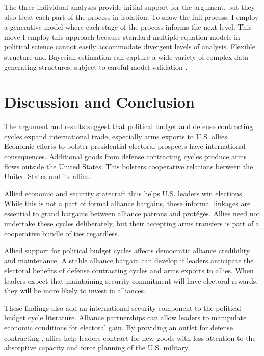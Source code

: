 \documentclass[12pt]{article}
\begin{document}
The three individual analyses provide initial support for the argument, but they also treat each part of the process in isolation. 
To show the full process, I employ a generative model where each stage of the process informs the next level.
This move 
I employ this approach because standard multiple-equation models in political science cannot easily accommodate divergent levels of analysis.
Flexible structure and Bayesian estimation can capture a wide variety of complex data-generating structures, subject to careful model validation \citep{Betancourt2021}. 





\section{Discussion and Conclusion}


The argument and results suggest that political budget and defense contracting cycles expand international trade, especially arms exports to U.S. allies. 
Economic efforts to bolster presidential electoral prospects have international consequences. 
Additional goods from defense contracting cycles produce arms flows outside the United States.
This bolsters cooperative relations between the United States and its allies.


Allied economic and security statecraft thus helps U.S. leaders win elections. 
While this is not a part of formal alliance bargains, these informal linkages are essential to grand bargains between alliance patrons and prot{\'e}g{\'e}s.
Allies need not undertake these cycles deliberately, but their accepting arms transfers is part of a cooperative bundle of ties regardless.


Allied support for political budget cycles affects democratic alliance credibility and maintenance. 
A stable alliance bargain can develop if leaders anticipate the electoral benefits of defense contracting cycles and arms exports to allies.
When leaders expect that maintaining security commitment will have electoral rewards, they will be more likely to invest in alliances. 


These findings also add an international security component to the political budget cycle literature.
Alliance partnerships can allow leaders to manipulate economic conditions for electoral gain. 
By providing an outlet for defense contracting , allies help leaders contract for new goods with less attention to the absorptive capacity and force planning of the U.S. military.
\end{document}

